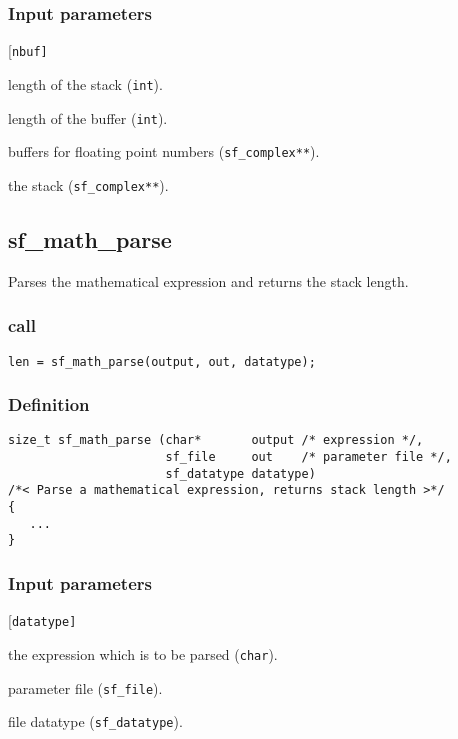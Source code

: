 \subsubsection*{Input parameters}
\begin{desclist}{\tt }{\quad}[\tt nbuf]
   \setlength\itemsep{0pt}
   \item[len]  length of the stack (\texttt{int}). 
   \item[nbuf] length of the buffer (\texttt{int}). 
   \item[fbuf] buffers for floating point numbers (\texttt{sf\_complex**}).  
   \item[fst]  the stack (\texttt{sf\_complex**}).  
\end{desclist}




\subsection{{sf\_math\_parse}}
Parses the mathematical expression and returns the stack length.

\subsubsection*{call}
\begin{verbatim}len = sf_math_parse(output, out, datatype);\end{verbatim}

\subsubsection*{Definition}
\begin{verbatim}
size_t sf_math_parse (char*       output /* expression */, 
                      sf_file     out    /* parameter file */,
                      sf_datatype datatype)
/*< Parse a mathematical expression, returns stack length >*/ 
{
   ...
}
\end{verbatim}

\subsubsection*{Input parameters}
\begin{desclist}{\tt }{\quad}[\tt datatype]
   \setlength\itemsep{0pt}
   \item[output]   the expression which is to be parsed (\texttt{char}). 
   \item[out]      parameter file (\texttt{sf\_file}). 
   \item[datatype] file datatype (\texttt{sf\_datatype}).  
\end{desclist}

